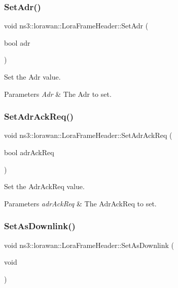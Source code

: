 \subsubsection{\texorpdfstring{Set\+Adr()}{SetAdr()}}
{\footnotesize\ttfamily void ns3\+::lorawan\+::\+Lora\+Frame\+Header\+::\+Set\+Adr (\begin{DoxyParamCaption}\item[{bool}]{adr }\end{DoxyParamCaption})}

Set the Adr value.


\begin{DoxyParams}{Parameters}
{\em Adr} & The Adr to set. \\
\hline
\end{DoxyParams}
\mbox{\label{classns3_1_1lorawan_1_1LoraFrameHeader_a97022ac4ffee6dd63f1541b948460fe9}} 
\subsubsection{\texorpdfstring{Set\+Adr\+Ack\+Req()}{SetAdrAckReq()}}
{\footnotesize\ttfamily void ns3\+::lorawan\+::\+Lora\+Frame\+Header\+::\+Set\+Adr\+Ack\+Req (\begin{DoxyParamCaption}\item[{bool}]{adr\+Ack\+Req }\end{DoxyParamCaption})}

Set the Adr\+Ack\+Req value.


\begin{DoxyParams}{Parameters}
{\em adr\+Ack\+Req} & The Adr\+Ack\+Req to set. \\
\hline
\end{DoxyParams}
\mbox{\label{classns3_1_1lorawan_1_1LoraFrameHeader_aeeade331e76a7260c583a64706b3b4ec}} 
\subsubsection{\texorpdfstring{Set\+As\+Downlink()}{SetAsDownlink()}}
{\footnotesize\ttfamily void ns3\+::lorawan\+::\+Lora\+Frame\+Header\+::\+Set\+As\+Downlink (\begin{DoxyParamCaption}\item[{void}]{ }\end{DoxyParamCaption})}

